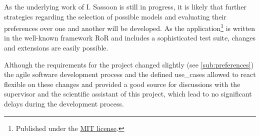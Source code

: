 As the underlying work of I. Sassoon \cite{sassoon2016CD} is still in progress, it is likely that further strategies regarding the selection of possible models and evaluating their preferences over one and another will be developed. As the application\footnote{Published under the \href{https://opensource.org/licenses/MIT}{MIT license}.} is written in the well-known framework \gls{RoR} and includes a sophisticated test suite, changes and extensions are easily possible.
 
Although the requirements for the project changed slightly (see \autoref{sub:preferences}) the agile software development process and the defined \glspl{use_case} allowed to react flexible on these changes and provided a good source for discussions with the supervisor and the scientific assistant of this project, which lead to no significant delays during the development process.